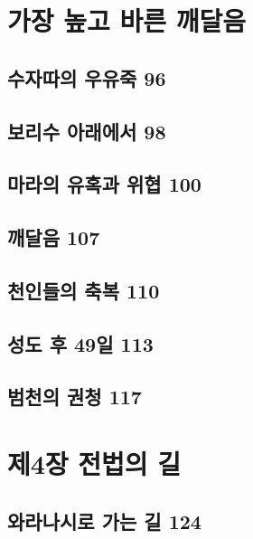 \documentclass[12pt, a4paper, oneside]{book}
\let\stdsection\section
\renewcommand\section{\newpage\stdsection}
\begin{document}
	\chapter{가장 높고 바른 깨달음}
	\noptcrule
	\parttoc				

	\section{수자따의 우유죽 96 }

	\section{보리수 아래에서 98 }

	\section{마라의 유혹과 위협 100 }

	\section{깨달음 107 }

	\section{천인들의 축복 110 }

	\section{성도 후 49일 113 }

	\section{범천의 권청 117}





	\chapter{제4장 전법의 길}
	\noptcrule
	\parttoc				

	\section{와라나시로 가는 길 124 }
\end{document}
